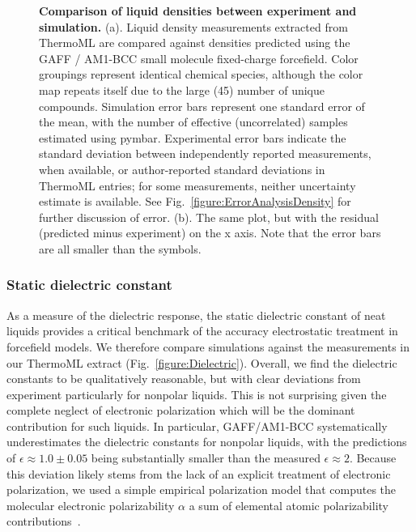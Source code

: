 \documentclass[aps,pre,twocolumn,nofootinbib,superscriptaddress,linenumbers]{revtex4-1}
\begin{document}
\begin{figure}
\caption{{\bf Comparison of liquid densities between experiment and simulation.}
(a).  Liquid density measurements extracted from ThermoML are compared against densities predicted using the GAFF / AM1-BCC small molecule fixed-charge forcefield.
Color groupings represent identical chemical species, although the color map repeats itself due to the large (45) number of unique compounds.
Simulation error bars represent one standard error of the mean, with the number of effective (uncorrelated) samples estimated using pymbar.  
Experimental error bars indicate the standard deviation between independently reported measurements, when available, or author-reported standard deviations in ThermoML entries; for some measurements, neither uncertainty estimate is available.  
See Fig.~\ref{figure:ErrorAnalysisDensity} for further discussion of error.  (b).  The same plot, but with the residual (predicted minus experiment) on the x axis.  Note that the error bars are all smaller than the symbols.  
}
\label{figure:Density}
\end{figure}


\subsubsection{Static dielectric constant}

As a measure of the dielectric response, the static dielectric constant of neat liquids provides a critical benchmark of the accuracy electrostatic treatment in forcefield models.  
We therefore compare simulations against the measurements in our ThermoML extract (Fig.~\ref{figure:Dielectric}).  
Overall, we find the dielectric constants to be qualitatively reasonable, but with clear deviations from experiment particularly for nonpolar liquids. 
This is not surprising given the complete neglect of electronic polarization which will be the dominant contribution for such liquids.
In particular, GAFF/AM1-BCC systematically underestimates the dielectric constants for nonpolar liquids, with the predictions of $\epsilon \approx 1.0 \pm 0.05$ being substantially smaller than the measured $\epsilon \approx 2$.  
Because this deviation likely stems from the lack of an explicit treatment of electronic polarization, we used a simple empirical polarization model that computes the molecular electronic polarizability $\alpha$ a sum of elemental atomic polarizability contributions~\cite{bosque2002polarizabilities}.
\end{document}
